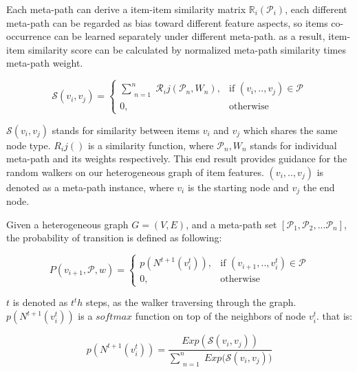 Each meta-path can derive a item-item similarity matrix $\mathbb{R}_i(\mathcal{P}_i)$, each different meta-path can be regarded as bias toward different feature aspects, so items co-occurrence can be learned separately under different meta-path.
as a result, item-item similarity score can be calculated by normalized meta-path similarity times meta-path weight.

\begin{equation}\label{itemsim}
    \mathcal{S}(v_i,v_j) = 
    \begin{cases}
         \sum\limits_{\substack{n=1}}^{n} \mathcal{R}_ij(\mathcal{P}_n,{W_n}),& \text{if } (v_{i}, .., v_{j}) \in \mathcal{P} \\
         0,              & \text{otherwise}
     \end{cases}
\end{equation}

$\mathcal{S}(v_i,v_j)$ stands for similarity between items $v_i$ and $v_j$ which shares the same node type. $R_ij()$ is a similarity function, where $\mathcal{P}_n, {W_n}$ stands for individual meta-path and its weights respectively. This end result provides guidance for the random walkers on our heterogeneous graph of item features. $(v_{i}, .., v_{j})$ is denoted as a meta-path instance, where $v_i$ is the starting node and $v_j$ the end node.

Given a heterogeneous graph $G = (V,E)$, and a meta-path set $[\mathcal{P}_1, \mathcal{P}_2, ... \mathcal{P}_n]$, the probability of transition is defined as following:

\begin{equation}\label{hetewalker}
    P(v_{i+1},\mathcal{P},w)= 
        \begin{cases}
            p({N^{t+1}(v_{i}^t)}),& \text{if } (v_{i+1}, .., v_{i}^t) \in \mathcal{P} \\
            0,              & \text{otherwise}
        \end{cases}
\end{equation}

$t$ is denoted as $t^th$ steps, as the walker traversing through the graph.
$p({N^{t+1}(v_{i}^t)})$ is a $softmax$ function on top of the neighbors of node $v_{i}^t$. 
that is:

\begin{equation}\label{softmaxwalker}
    p({N^{t+1}(v_{i}^t)}) = \frac{Exp(\mathcal{S}(v_i,v_j))}{\sum\limits_{\substack{n=1}}^{n} {Exp(\mathcal{S}(v_i,v_j)})}
\end{equation}

